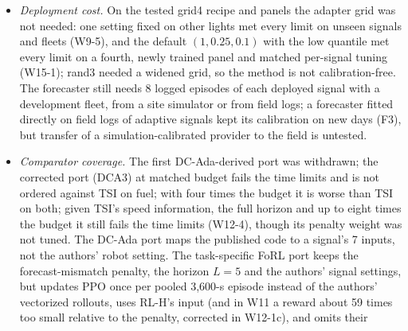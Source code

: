 \begin{itemize}
($+1.05\%$ and $+3.90\%$, W15-3a), which we attribute, without isolating it, to fleets trained under Krauss; a fleet retrained under IDM was
not tried. The revision's agent time loss is $+0.19$\,s/veh on the W8-2 panel and its bound reaches the margin under 80\% detection; rule
R15-U lowers it to $-0.09$ (upper $+0.09$) on the same signals and fleets. Field data weigh these dependences unequally: measured fuel
favours PHEMlight5, under which the revision saves, and measured trajectories favour IDM, under which it does not; SUMO's Krauss cars brake
later and harder at a stop than measured drivers, so the Krauss results overstate the eco-driving benefit: with drivers matched to measured
car following and stop approaches the trained fleet saved $1.10\%$ (HBEFA4) and $0.31\%$ (PHEMlight5, interval including zero) (W17). The fleet's own fixed-time
benefit survives PHEMlight5 ($-4.43\%$). A 1-s minimum delay, implemented by a per-link query cache, removes most of the saving; an exact periodic broadcast with
fixed latency was not modelled.
\item \emph{Deployment cost.} On the tested grid4 recipe and panels the adapter grid was not needed: one setting fixed on other lights met
every limit on unseen signals and fleets (W9-5), and the default $(1,0.25,0.1)$ with the low quantile met every limit on a fourth, newly
trained panel and matched per-signal tuning (W15-1); rand3 needed a widened grid, so the method is not calibration-free. The forecaster still needs 8 logged episodes of each deployed signal with a development fleet, from a site simulator or
from field logs; a forecaster fitted directly on field logs of adaptive signals kept its calibration on new days (F3), but transfer
of a simulation-calibrated provider to the field is untested.
\item \emph{Comparator coverage.} The first DC-Ada-derived port was withdrawn; the corrected port (DCA3) at matched budget fails the time limits and is not ordered against TSI on fuel; with four times the budget it is worse than TSI on both; given TSI's speed information, the full horizon and up to eight times the budget it still fails the time limits (W12-4), though its penalty weight was not tuned. The DC-Ada port maps the published code to a signal's 7 inputs, not the authors' robot setting. The task-specific FoRL port keeps the
forecast-mismatch penalty, the horizon $L=5$ and the authors' signal settings, but updates PPO once per pooled 3,600-s episode instead
of the authors' vectorized rollouts, uses RL-H's input (and in W11 a reward about 59 times too small relative to the penalty, corrected in W12-1c), and omits their

\end{itemize}
